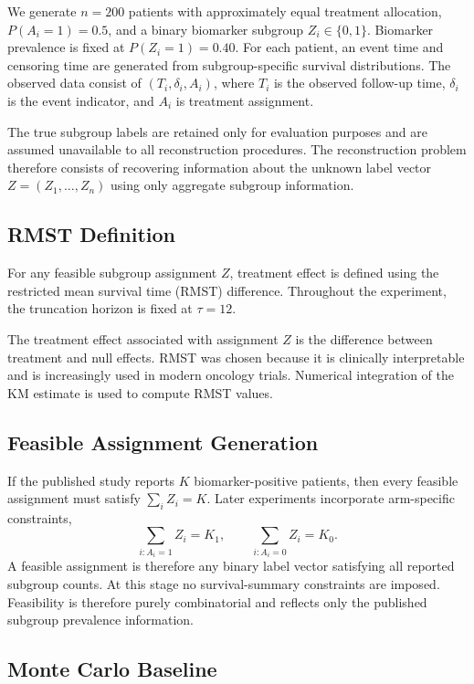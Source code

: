\documentclass[11pt]{article}
\begin{document}
We generate \(n=200\) patients with approximately equal treatment allocation, \(P(A_i=1)=0.5\), and a binary biomarker subgroup \(Z_i\in\{0,1\}\). Biomarker prevalence is fixed at \(P(Z_i=1)=0.40\).
For each patient, an event time and censoring time are generated from subgroup-specific survival distributions. The observed data consist of \((T_i,\delta_i,A_i)\), where \(T_i\) is the observed follow-up time, \(\delta_i\) is the event indicator, and \(A_i\) is treatment assignment.

The true subgroup labels are retained only for evaluation purposes and are assumed unavailable to all reconstruction procedures. The reconstruction problem therefore consists of recovering information about the unknown label vector \(Z=(Z_1,\ldots,Z_n)\) using only aggregate subgroup information.

\subsection{RMST Definition}

For any feasible subgroup assignment \(Z\), treatment effect is defined using the restricted mean survival time (RMST) difference.
Throughout the experiment, the truncation horizon is fixed at \(\tau=12\).

The treatment effect associated with assignment \(Z\) is the difference between treatment and null effects.
RMST was chosen because it is clinically interpretable and is increasingly used in modern oncology trials.
Numerical integration of the KM estimate is used to compute RMST values.

\subsection{Feasible Assignment Generation}

If the published study reports \(K\) biomarker-positive patients, then every feasible assignment must satisfy \(\sum_i Z_i=K\).
Later experiments incorporate arm-specific constraints,
\[\sum_{i:A_i=1} Z_i=K_1,\qquad \sum_{i:A_i=0} Z_i=K_0.\]
A feasible assignment is therefore any binary label vector satisfying all reported subgroup counts.
At this stage no survival-summary constraints are imposed. Feasibility is therefore purely combinatorial and reflects only the published subgroup prevalence information.

\subsection{Monte Carlo Baseline}
\end{document}
